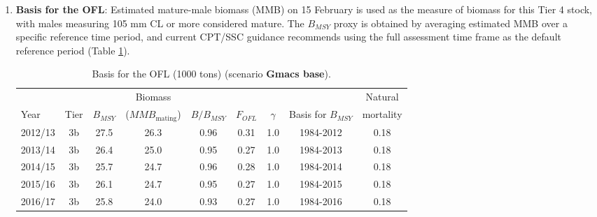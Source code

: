 \documentclass[]{article}
\providecommand{\tightlist}{%
  \setlength{\itemsep}{0pt}\setlength{\parskip}{0pt}}
\begin{document}
\begin{enumerate}
\def\labelenumi{\arabic{enumi}.}
\setcounter{enumi}{5}
\tightlist
\item
  \textbf{Basis for the OFL}: Estimated mature-male biomass (MMB) on 15
  February is used as the measure of biomass for this Tier 4 stock, with
  males measuring 105 mm CL or more considered mature. The
  \(B_\mathit{MSY}\) proxy is obtained by averaging estimated MMB over a
  specific reference time period, and current CPT/SSC guidance
  recommends using the full assessment time frame as the default
  reference period (Table \ref{tab:ofl_basis}).

  \begin{table}[ht]
  \centering
  \caption{Basis for the OFL (1000 tons) (scenario {\bf Gmacs base}).} 
  \label{tab:ofl_basis}
  \begin{tabular}{lcccccccc}
  \hline
   &      &                  & Biomass                        &                    &                  &          &                            & Natural  \\ 
  Year & Tier & $B_\mathit{MSY}$ & ($\mathit{MMB}_\text{mating}$) & $B/B_\mathit{MSY}$ & $F_\mathit{OFL}$ & $\gamma$ & Basis for $B_\mathit{MSY}$ & mortality \\ 
  \hline
  2012/13 & 3b & 27.5 & 26.3    & 0.96         & 0.31 & 1.0 & 1984-2012 &          0.18 \\
  2013/14 & 3b & 26.4 & 25.0    & 0.95         & 0.27 & 1.0 & 1984-2013 &          0.18 \\
  2014/15 & 3b & 25.7 & 24.7    & 0.96         & 0.28 & 1.0 & 1984-2014 &          0.18 \\
  2015/16 & 3b & 26.1 & 24.7    & 0.95         & 0.27 & 1.0 & 1984-2015 &          0.18 \\
  2016/17 & 3b & 25.8 & 24.0    & 0.93         & 0.27 & 1.0 & 1984-2016 &          0.18 \\
  \hline
  \end{tabular}
  \end{table}
\end{enumerate}
\end{document}
